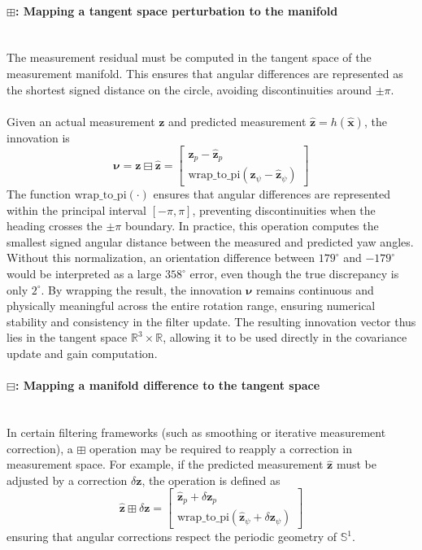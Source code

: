 \paragraph{$\boxplus$: Mapping a tangent space perturbation to the manifold} \mbox{}\\[0.5em] \noindent
The measurement residual must be computed in the tangent space of the measurement manifold. This ensures that angular differences are represented as the shortest signed distance on the circle, avoiding discontinuities around $\pm\pi$. 
\\ \\ 
Given an actual measurement $\mathbf{z}$ and predicted measurement $\hat{\mathbf{z}} = h(\hat{\mathbf{x}})$, the innovation is
$$
    \boldsymbol{\nu} = \mathbf{z} \boxminus \hat{\mathbf{z}} =
    \begin{bmatrix}
        \mathbf{z}_p - \hat{\mathbf{z}}_p \\
        \mathrm{wrap\_to\_pi}(\mathbf{z}_\psi - \hat{\mathbf{z}}_\psi)
    \end{bmatrix}
$$
The function $\mathrm{wrap\_to\_pi}(\cdot)$ ensures that angular differences are represented within the principal interval $[-\pi, \pi]$, preventing discontinuities when the heading crosses the $\pm\pi$ boundary. In practice, this operation computes the smallest signed angular distance between the measured and predicted yaw angles. Without this normalization, an orientation difference between $179^\circ$ and $-179^\circ$ would be interpreted as a large $358^\circ$ error, even though the true discrepancy is only $2^\circ$. By wrapping the result, the innovation $\boldsymbol{\nu}$ remains continuous and physically meaningful across the entire rotation range, ensuring numerical stability and consistency in the filter update. The resulting innovation vector thus lies in the tangent space $\mathbb{R}^3 \times \mathbb{R}$, allowing it to be used directly in the covariance update and gain computation.

\paragraph{$\boxminus$: Mapping a manifold difference to the tangent space} \mbox{}\\[0.5em] \noindent
In certain filtering frameworks (such as smoothing or iterative measurement correction), a $\boxplus$ operation may be required to reapply a correction in measurement space. For example, if the predicted measurement $\hat{\mathbf{z}}$ must be adjusted by a correction $\delta\mathbf{z}$, the operation is defined as
$$
    \hat{\mathbf{z}} \boxplus \delta\mathbf{z} =
    \begin{bmatrix}
        \hat{\mathbf{z}}_p + \delta\mathbf{z}_p \\
        \mathrm{wrap\_to\_pi}(\hat{\mathbf{z}}_\psi + \delta\mathbf{z}_\psi)
    \end{bmatrix}
$$
ensuring that angular corrections respect the periodic geometry of $\mathbb{S}^1$.  

